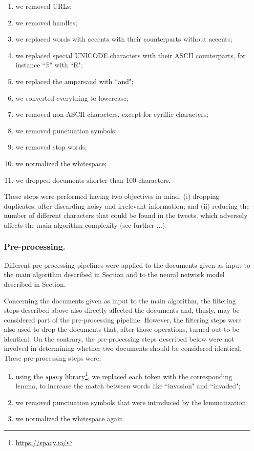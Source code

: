 \documentclass[runningheads]{llncs}
\begin{document}
\begin{enumerate}
  \item we removed URLs;
  \item we removed handles;
  \item we replaced words with accents with their counterparts without accents;
  \item we replaced special UNICODE characters with their ASCII counterparts, for instance “$\mathbb{R}$" with “R";
  \item we replaced the ampersand with “and";
  \item we converted everything to lowercase;
  \item we removed non-ASCII characters, except for cyrillic characters;
  \item we removed punctuation symbols;
  \item we removed stop words;
  \item we normalized the whitespace;
  \item we dropped documents shorter than 100 characters.
\end{enumerate}

These steps were performed having two objectives in mind: (i) dropping duplicates, after discarding noisy and irrelevant information; and (ii) reducing the number of different characters that could be found in the tweets, which adversely affects the main algorithm complexity (see further ...).
 
\subsubsection{Pre-processing.} Different pre-processing pipelines were applied to the documents given as input to the main algorithm described in Section and to the neural network model described in Section.

Concerning the documents given as input to the main algorithm, the filtering steps described above also directly affected the documents and, thusly, may be considered part of the pre-processing pipeline. However, the filtering steps were also used to drop the documents that, after those operations, turned out to be identical. On the contrary, the pre-processing steps described below were not involved in determining whether two documents should be considered identical. These pre-processing steps were:

\begin{enumerate}
  \item using the \texttt{spacy} library\footnote{\url{https://spacy.io/}}, we replaced each token with the corresponding lemma, to increase the match between words like “invasion" and “invaded";
  \item we removed punctuation symbols that were introduced by the lemmatization;
  \item we normalized the whitespace again.
\end{enumerate}
\end{document}
